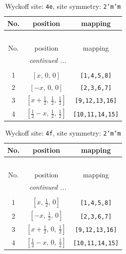 \documentclass[fleqn,8pt]{jsarticle}
\begin{document}
\begin{longtable}{ccc}
\caption{Wyckoff site: {\tt 4e}, site symmetry: {\tt 2'm'm}}
 \\
 \hline \hline
No. & position & mapping \\ \hline \endfirsthead

\multicolumn{2}{l}{\tablename\ \thetable{}} \\
 \hline \hline
No. & position & mapping \\ \hline \endhead

 \hline \hline
\multicolumn{2}{r}{\footnotesize\it continued ...} \\ \endfoot

 \hline \hline
\multicolumn{2}{r}{} \\ \endlastfoot

1 & $\left[ x,\, 0,\, 0 \right]$ & {\tt [1,4,5,8]} \\ \hline
2 & $\left[ - x,\, 0,\, 0 \right]$ & {\tt [2,3,6,7]} \\ \hline
3 & $\left[ x + \frac{1}{2},\, \frac{1}{2},\, \frac{1}{2} \right]$ & {\tt [9,12,13,16]} \\ \hline
4 & $\left[ \frac{1}{2} - x,\, \frac{1}{2},\, \frac{1}{2} \right]$ & {\tt [10,11,14,15]} \\
\end{longtable}
\renewcommand{\arraystretch}{1.2}
\begin{longtable}{ccc}
\caption{Wyckoff site: {\tt 4f}, site symmetry: {\tt 2'm'm}}
 \\
 \hline \hline
No. & position & mapping \\ \hline \endfirsthead

\multicolumn{2}{l}{\tablename\ \thetable{}} \\
 \hline \hline
No. & position & mapping \\ \hline \endhead

 \hline \hline
\multicolumn{2}{r}{\footnotesize\it continued ...} \\ \endfoot

 \hline \hline
\multicolumn{2}{r}{} \\ \endlastfoot

1 & $\left[ x,\, \frac{1}{2},\, 0 \right]$ & {\tt [1,4,5,8]} \\ \hline
2 & $\left[ - x,\, \frac{1}{2},\, 0 \right]$ & {\tt [2,3,6,7]} \\ \hline
3 & $\left[ x + \frac{1}{2},\, 0,\, \frac{1}{2} \right]$ & {\tt [9,12,13,16]} \\ \hline
4 & $\left[ \frac{1}{2} - x,\, 0,\, \frac{1}{2} \right]$ & {\tt [10,11,14,15]} \\
\end{longtable}
\end{document}

